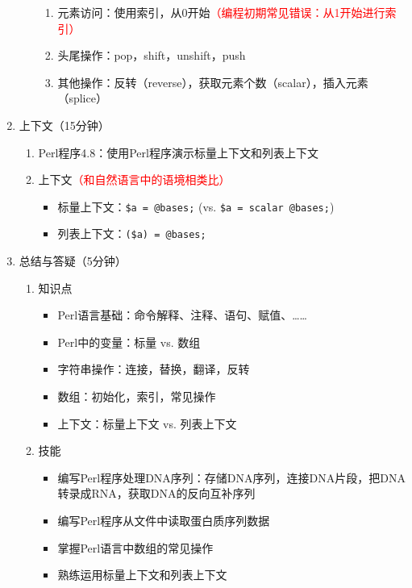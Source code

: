 \documentclass{TIJMUjiaoanLL}
\begin{document}
\begin{enumerate}
\begin{enumerate}
\begin{enumerate}
	  \item 元素访问：使用索引，从0开始\textcolor{red}{（编程初期常见错误：从1开始进行索引）}
	  \item 头尾操作：pop，shift，unshift，push
	  \item 其他操作：反转（reverse），获取元素个数（scalar），插入元素（splice）
	\end{enumerate}
    \end{enumerate}
  \item 上下文（15分钟）
    \begin{enumerate}
      \item Perl程序4.8：使用Perl程序演示标量上下文和列表上下文
      \item 上下文\textcolor{red}{（和自然语言中的语境相类比）}
	\begin{itemize}
	  \item 标量上下文：\verb|$a = @bases;| (vs. \verb|$a = scalar @bases;|)
	  \item 列表上下文：\verb|($a) = @bases;|
	\end{itemize}
    \end{enumerate}
  \item 总结与答疑（5分钟）
    \begin{enumerate}
      \item 知识点
	\begin{itemize}
	  \item Perl语言基础：命令解释、注释、语句、赋值、……
	  \item Perl中的变量：标量 vs. 数组
	  \item 字符串操作：连接，替换，翻译，反转
	  \item 数组：初始化，索引，常见操作
	  \item 上下文：标量上下文 vs. 列表上下文
	\end{itemize}
      \item 技能
	\begin{itemize}
	  \item 编写Perl程序处理DNA序列：存储DNA序列，连接DNA片段，把DNA转录成RNA，获取DNA的反向互补序列
	  \item 编写Perl程序从文件中读取蛋白质序列数据
	  \item 掌握Perl语言中数组的常见操作
	  \item 熟练运用标量上下文和列表上下文
	\end{itemize}
    \end{enumerate}
\end{enumerate}

\otherTail

\end{document}

